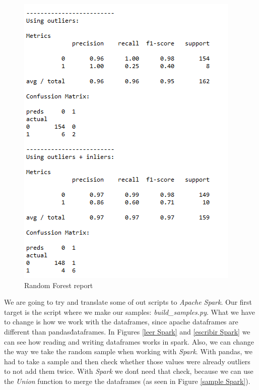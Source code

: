 \documentclass[idxtotoc,hyperref,openany]{labbook} %
\begin{document}
\begin{figure}[h]
\includegraphics[width=0.9\linewidth]{Milestone3/report_selection.png}
\setlength\belowcaptionskip{-10pt}
\caption{Random Forest report}
\label{random forest Report}
\end{figure}


We are going to try and translate some of out scripts to \textit{Apache Spark}. Our first target is the script where we make our samples: \textit{build\_samples.py}. What we have to change is how we work with the dataframes, since apache dataframes are different than pandas\' dataframes. In Figures \ref{leer Spark} and \ref{escribir Spark} we can see how reading and writing dataframes works in spark. Also, we can change the way we take the random sample when working with \textit{Spark}. With pandas, we had to take a sample and then check whether those values were already outliers to not add them twice. With \textit{Spark} we don\'t need that check, because we can use the \textit{Union} function to merge the dataframes (as seen in Figure \ref{sample Spark}).
\end{document}
